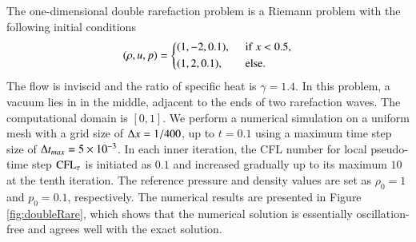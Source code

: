 The one-dimensional double rarefaction problem \cite{hu2004kineticDoubleRare}
is a Riemann problem with the following initial conditions
\begin{equation}
    (\rho,u,p) = \begin{dcases}
        (1,-2,0.1),\ \  & \mathrm{if} \ x < 0.5,       \\
        (1,2,0.1),\ \   & \mathrm{else}.
    \end{dcases}
\end{equation}
The flow is inviscid and the ratio of specific heat is $\gamma=1.4$.
In this problem, a vacuum lies in in the middle, adjacent to the ends of two rarefaction waves.
The computational domain is $[0,1]$.
We perform a numerical simulation on a uniform mesh with a grid size of $\mathrm\Delta x = 1/400$, up to $t=0.1$
 using a maximum time step size of $\mathrm\Delta t_{max}= 5 \times 10 ^{-3}$.
In each inner iteration, the CFL number for local pseudo-time step $\text{CFL}_\tau$ is initiated as $0.1$ and
increased gradually up to its maximum $10$ at the tenth iteration.
The reference pressure and density values are set as $\rho_0=1$ and $p_0=0.1$, respectively.
The numerical results are presented in Figure \ref{fig:doubleRare}, which shows that the numerical solution is essentially oscillation-free and agrees well with the exact solution.

